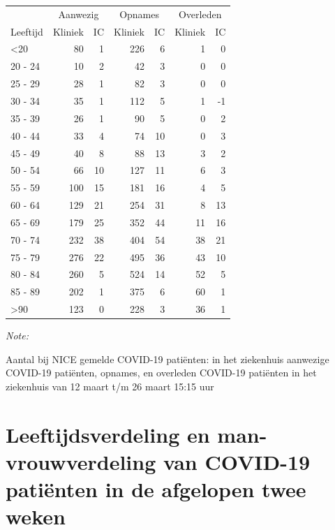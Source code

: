 \documentclass[
  english,
  man,floatsintext]{apa6}
\begin{document}
\begin{table}
\centering\begingroup\fontsize{10}{12}\selectfont

\begin{threeparttable}
\begin{tabular}{lrrrrrr}
\toprule
\multicolumn{1}{c}{ } & \multicolumn{2}{c}{Aanwezig} & \multicolumn{2}{c}{Opnames} & \multicolumn{2}{c}{Overleden} \\
\cmidrule(l{3pt}r{3pt}){2-3} \cmidrule(l{3pt}r{3pt}){4-5} \cmidrule(l{3pt}r{3pt}){6-7}
Leeftijd & Kliniek & IC & Kliniek & IC & Kliniek & IC\\
\midrule
<20 & 80 & 1 & 226 & 6 & 1 & 0\\
20 - 24 & 10 & 2 & 42 & 3 & 0 & 0\\
25 - 29 & 28 & 1 & 82 & 3 & 0 & 0\\
30 - 34 & 35 & 1 & 112 & 5 & 1 & -1\\
35 - 39 & 26 & 1 & 90 & 5 & 0 & 2\\
40 - 44 & 33 & 4 & 74 & 10 & 0 & 3\\
45 - 49 & 40 & 8 & 88 & 13 & 3 & 2\\
50 - 54 & 66 & 10 & 127 & 11 & 6 & 3\\
55 - 59 & 100 & 15 & 181 & 16 & 4 & 5\\
60 - 64 & 129 & 21 & 254 & 31 & 8 & 13\\
65 - 69 & 179 & 25 & 352 & 44 & 11 & 16\\
70 - 74 & 232 & 38 & 404 & 54 & 38 & 21\\
75 - 79 & 276 & 22 & 495 & 36 & 43 & 10\\
80 - 84 & 260 & 5 & 524 & 14 & 52 & 5\\
85 - 89 & 202 & 1 & 375 & 6 & 60 & 1\\
>90 & 123 & 0 & 228 & 3 & 36 & 1\\
\bottomrule
\end{tabular}
\begin{tablenotes}
\item \textit{Note: } 
\item Aantal bij NICE gemelde COVID-19 patiënten: in het ziekenhuis aanwezige COVID-19 patiënten, opnames, en overleden COVID-19 patiënten in het ziekenhuis van 12 maart t/m 26 maart 15:15 uur
\end{tablenotes}
\end{threeparttable}
\endgroup{}
\end{table}

\newpage

\hypertarget{leeftijdsverdeling-en-man-vrouwverdeling-van-covid-19-patiuxebnten-in-de-afgelopen-twee-weken}{%
\section{Leeftijdsverdeling en man-vrouwverdeling van COVID-19 patiënten in de afgelopen twee weken}\label{leeftijdsverdeling-en-man-vrouwverdeling-van-covid-19-patiuxebnten-in-de-afgelopen-twee-weken}}
\end{document}
